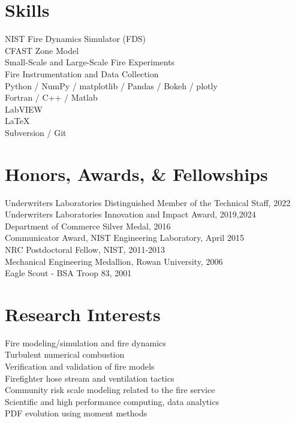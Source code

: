 \documentclass[10pt,letterpaper]{article}
\begin{document}

\section*{Skills}
NIST Fire Dynamics Simulator (FDS) \\
CFAST Zone Model \\
Small-Scale and Large-Scale Fire Experiments \\
Fire Instrumentation and Data Collection \\
Python / NumPy / matplotlib / Pandas / Bokeh / plotly \\
Fortran / C++ / Matlab \\
LabVIEW \\
\LaTeX \\
Subversion / Git \\

\section*{Honors, Awards, \& Fellowships}
Underwriters Laboratories Distinguished Member of the Technical Staff, 2022 \\
Underwriters Laboratories Innovation and Impact Award, 2019,2024 \\
Department of Commerce Silver Medal, 2016 \\
Communicator Award, NIST Engineering Laboratory, April 2015 \\
NRC Postdoctoral Fellow, NIST, 2011-2013 \\
Mechanical Engineering Medallion, Rowan University, 2006 \\
Eagle Scout - BSA Troop 83, 2001 \\

\section*{Research Interests}
Fire modeling/simulation and fire dynamics \\
Turbulent numerical combustion \\
Verification and validation of fire models \\
Firefighter hose stream and ventilation tactics \\
Community risk scale modeling related to the fire service \\
Scientific and high performance computing, data analytics \\
PDF evolution using moment methods \\
\end{document}

